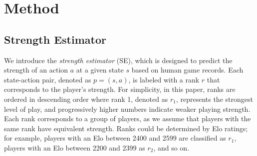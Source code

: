 


\section{Method}
\label{sec:method}

\subsection{Strength Estimator}
\label{subsec:method_strength_estimator}
We introduce the \textit{strength estimator} (SE), which is designed to predict the strength of an action $a$ at a given state $s$ based on human game records.
Each state-action pair, denoted as $p=(s,a)$, is labeled with a rank $r$ that corresponds to the player's strength.
For simplicity, in this paper, ranks are ordered in descending order where rank 1, denoted as $r_1$, represents the strongest level of play, and progressively higher numbers indicate weaker playing strength.
Each rank corresponds to a group of players, as we assume that players with the same rank have equivalent strength.
Ranks could be determined by Elo ratings; for example, players with an Elo between 2400 and 2599 are classified as $r_1$, players with an Elo between 2200 and 2399 as $r_2$, and so on.

